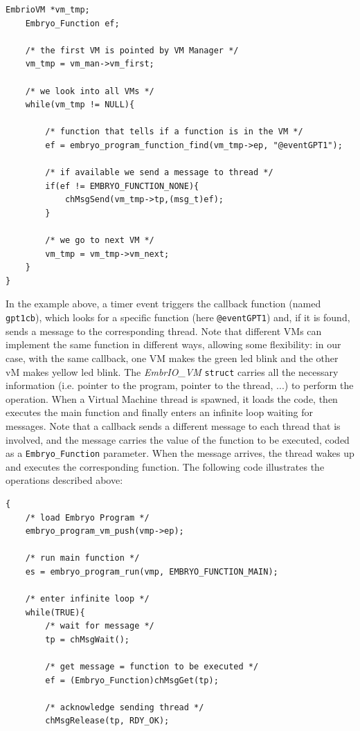 \documentclass[a4paper,10pt]{article}
\begin{document}
\begin{multicols}{2}
\begin{lstlisting}[caption={Callback looking for a function in VMs}]
	EmbrioVM *vm_tmp;
	Embryo_Function ef;
	
	/* the first VM is pointed by VM Manager */
	vm_tmp = vm_man->vm_first;
	
	/* we look into all VMs */
	while(vm_tmp != NULL){
		
		/* function that tells if a function is in the VM */
		ef = embryo_program_function_find(vm_tmp->ep, "@eventGPT1");
		
		/* if available we send a message to thread */
		if(ef != EMBRYO_FUNCTION_NONE){
			chMsgSend(vm_tmp->tp,(msg_t)ef);
		}
		
		/* we go to next VM */
		vm_tmp = vm_tmp->vm_next;
	}
}
\end{lstlisting}
\medskip
In the example above, a timer event triggers the callback function (named \texttt{gpt1cb}), which looks for a specific function (here \texttt{@eventGPT1}) and, if it is found, sends a message to the corresponding thread. Note that different VMs can implement the same function in different ways, allowing some flexibility: in our case, with the same callback, one VM makes the green led blink and the other vM makes yellow led blink.\newline
The \textit{EmbrIO\_VM} \texttt{struct} carries all the necessary information (i.e. pointer to the program, pointer to the thread, ...) to perform the operation.\newline
\medskip
When a Virtual Machine thread is spawned, it loads the code, then executes the main function and finally enters an infinite loop waiting for messages. Note that a callback sends a different message to each thread that is involved, and the message carries the value of the function to be executed, coded as a \texttt{Embryo\_Function} parameter. When the message arrives, the thread wakes up and executes the corresponding function. The following code illustrates the operations described above:
\medskip
\lstset{language=C}
\begin{lstlisting}[caption={Callback looking for a function in VMs}]
{
	/* load Embryo Program */
	embryo_program_vm_push(vmp->ep);
	
	/* run main function */
	es = embryo_program_run(vmp, EMBRYO_FUNCTION_MAIN);
	
	/* enter infinite loop */
	while(TRUE){
		/* wait for message */
		tp = chMsgWait();
		
		/* get message = function to be executed */
		ef = (Embryo_Function)chMsgGet(tp);
		
		/* acknowledge sending thread */
		chMsgRelease(tp, RDY_OK);
		

\end{lstlisting}
\end{multicols}
\end{document}
